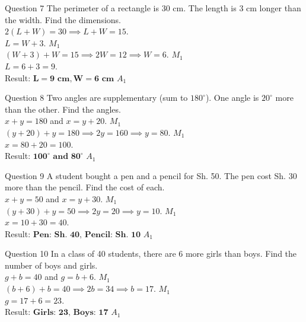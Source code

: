 \documentclass[12pt, a4paper, oneside]{article}
\begin{document}
\begin{solvingbox}{Question 7}
The perimeter of a rectangle is 30 cm. The length is 3 cm longer than the width. Find the dimensions. \\
$2(L + W) = 30 \implies L + W = 15$. \\
$L = W + 3$. \hfill $M_1$ \\
$(W + 3) + W = 15 \implies 2W = 12 \implies W = 6$. \hfill $M_1$ \\
$L = 6 + 3 = 9$. \\
Result: $\mathbf{L=9\text{ cm}, W=6\text{ cm}}$ \hfill $A_1$
\end{solvingbox}

\begin{solvingbox}{Question 8}
Two angles are supplementary (sum to $180^\circ$). One angle is $20^\circ$ more than the other. Find the angles. \\
$x + y = 180$ and $x = y + 20$. \hfill $M_1$ \\
$(y + 20) + y = 180 \implies 2y = 160 \implies y = 80$. \hfill $M_1$ \\
$x = 80 + 20 = 100$. \\
Result: $\mathbf{100^\circ \text{ and } 80^\circ}$ \hfill $A_1$
\end{solvingbox}

\begin{solvingbox}{Question 9}
A student bought a pen and a pencil for Sh. 50. The pen cost Sh. 30 more than the pencil. Find the cost of each. \\
$x + y = 50$ and $x = y + 30$. \hfill $M_1$ \\
$(y + 30) + y = 50 \implies 2y = 20 \implies y = 10$. \hfill $M_1$ \\
$x = 10 + 30 = 40$. \\
Result: $\mathbf{\text{Pen: Sh. 40, Pencil: Sh. 10}}$ \hfill $A_1$
\end{solvingbox}

\begin{solvingbox}{Question 10}
In a class of 40 students, there are 6 more girls than boys. Find the number of boys and girls. \\
$g + b = 40$ and $g = b + 6$. \hfill $M_1$ \\
$(b + 6) + b = 40 \implies 2b = 34 \implies b = 17$. \hfill $M_1$ \\
$g = 17 + 6 = 23$. \\
Result: $\mathbf{\text{Girls: 23, Boys: 17}}$ \hfill $A_1$
\end{solvingbox}
\end{document}
